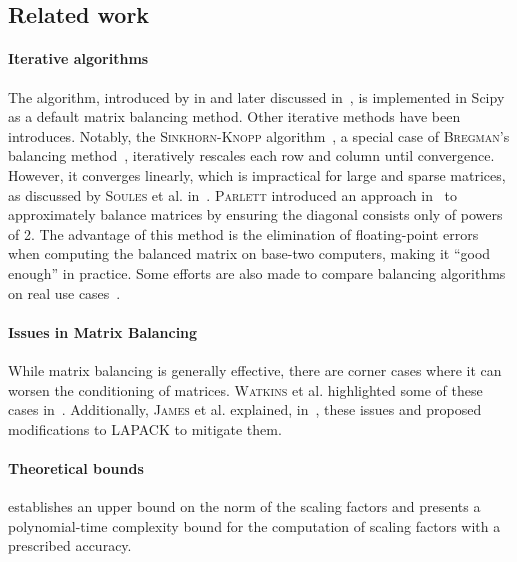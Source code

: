 
\subsection{Related work}

\paragraph*{Iterative algorithms} The  algorithm, introduced by  in \cite{osborne1960pre} and later discussed in~\cite{parlett1971balancing}, is implemented in Scipy as a default matrix balancing method. Other iterative methods have been introduces. Notably, the \textsc{Sinkhorn-Knopp} algorithm~\cite{sinkhorn1967concerning}, a special case of \textsc{Bregman}’s balancing method~\cite{lamond1981bregman}, iteratively rescales each row and column until convergence. However, it converges linearly, which is impractical for large and sparse matrices, as discussed by \textsc{Soules} et al. in~\cite{soules1991rate}. \textsc{Parlett} introduced an approach in~\cite{parlett1971balancing} to approximately balance matrices by ensuring the diagonal consists only of powers of 2. The advantage of this method is the elimination of floating-point errors when computing the balanced matrix on base-two computers, making it ``good enough'' in practice. Some efforts are also made to compare balancing algorithms on real use cases~\cite{schneider1990comparative}.

\paragraph*{Issues in Matrix Balancing} While matrix balancing is generally effective, there are corner cases where it can worsen the conditioning of matrices. \textsc{Watkins} et al. highlighted some of these cases in~\cite{watkins2006case}. Additionally, \textsc{James} et al. explained, in~\cite{james2014matrix}, these issues and proposed modifications to LAPACK to mitigate them.

\paragraph*{Theoretical bounds}  \cite{kalantari1996complexity} establishes an upper bound on the norm of the scaling factors and presents a polynomial-time complexity bound for the computation of scaling factors with a prescribed accuracy.

